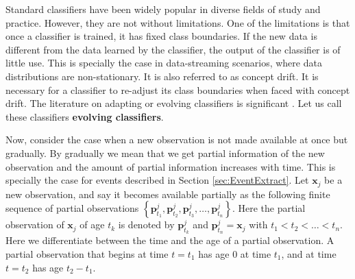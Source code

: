 \documentclass[11pt]{article}
\begin{document}
	Standard classifiers have been widely popular in diverse fields of study and practice. However, they are not without limitations. One of the limitations is that once a classifier is trained, it has fixed class boundaries. If the new data is different from the data learned by the classifier, the output of the classifier is of little use. This is specially the case in data-streaming scenarios, where data distributions are non-stationary. It is also referred to as concept drift. It is necessary for a classifier to re-adjust its class boundaries when faced with concept drift. The literature on adapting or evolving classifiers is significant \cite{duchi2011adaptive, dabbagh2005online, frey1991letter, giacinto1997adaptive, nishida2005ace,alippi2008just, alippi2008just2}. Let us call these classifiers {\bf{evolving classifiers}}.  
 
 
	Now, consider the case when a new observation is not made available at once but gradually. By gradually we mean that we get partial information of the new observation and the amount of partial information increases with time. This is specially the case for events described in Section \ref{sec:EventExtract}.  Let $\mathbf{x}_j$ be  a new observation, and say it becomes available partially as the following finite sequence of partial observations $\left \{\mathbf{p}^j_{t_1},\mathbf{p}^j_{t_2}, \mathbf{p}^j_{t_3}, \ldots,  \mathbf{p}^j_{t_n} \right \}$. Here the partial observation of $\mathbf{x}_j$ of age $t_k$ is denoted by $\mathbf{p}^j_{t_k}$ and   $\mathbf{p}^j_{t_n} = \mathbf{x}_j$ with $t_1 < t_2 < \ldots < t_n$.  Here we differentiate between the time and the age of a partial observation. A partial observation that begins at time $t =t_1$ has age $0$ at time $t_1$, and at time $t = t_2$ has age $ t_2 - t_1$. 
	
	
	
\end{document}
